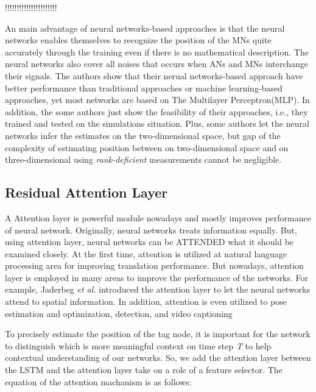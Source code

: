 \documentclass[letterpaper, 10 pt, conference]{ieeeconf}  %
\begin{document}
!!!!!!!!!!!!!!!!!!!!!!

 An main advantage of neural networks-based approaches is that the neural networks enables themselves to recognize the position of the MNs quite accurately through the training even if there is no mathematical description. The neural networks also cover all noises that occurs when ANs and MNs interchange their signals. The authors show that their nerual networks-based approach have better performance than traditional approaches or machine learning-based approaches, yet most networks are based on The Multilayer Perceptron(MLP). In addition, the some authors just show the feasibility of their approaches, i.e., they trained and tested on the simulations situation. Plus, some authors let the neural networks infer the estimates on the two-dimensional space, but gap of the complexity of estimating position between on two-dimensional space and on three-dimensional using \textit{rank-deficient} measurements cannot be negligible.
 


\subsection{Residual Attention Layer}

A Attention layer is powerful module nowadays and mostly improves performance of neural network. Originally, neural networks treats information equally. But, using attention layer, neural networks can be ATTENDED what it should be examined closely. At the first time, attention is utilized at natural language processing area for improving translation performance\cite{luong2015effective}. But nowadays, attention layer is employed in many areas to improve the performance of the networks. For example, Jaderbeg \textit{et al.}\cite{jaderberg2015spatial} introduced the attention layer to let the neural networks attend to spatial information. In addition, attention is even utilized to pose estimation and optimization\cite{parisotto2018global}, detection\cite{zhu2018towards}, and video captioning\cite{xu2017learning} 

To precisely estimate the position of the tag node, it is important for the network to distinguish which is more meaningful context on time step \textit{T} to help contextual understanding of our  networks. So, we add the attention layer between the LSTM and the attention layer take on a role of a feature selector\cite{wang2017residual}. The equation of the attention machanism is as follows: 
\end{document}
